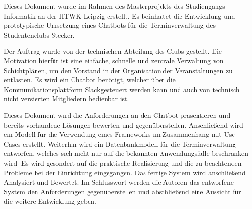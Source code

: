 Dieses Dokument wurde im Rahmen des Masterprojekts des Studiengangs Informatik an der HTWK-Leipzig erstellt. Es beinhaltet die Entwicklung und prototypische Umsetzung eines Chatbots für die Terminverwaltung des Studentenclubs \glqq Stecker\grqq .

Der Auftrag wurde von der technischen Abteilung des Clubs gestellt. Die Motivation hierfür ist eine einfache, schnelle und zentrale Verwaltung von Schichtplänen, um den Vorstand in der Organisation der Veranstaltungen zu entlasten.
Es wird ein Chatbot benötigt, welcher über die Kommunikationsplattform \glqq Slack\grqq gesteuert werden kann und auch von technisch nicht versierten Mitgliedern bedienbar ist.

Dieses Dokument wird die Anforderungen an den Chatbot präsentieren und bereits vorhandene Lösungen bewerten und gegenüberstellen. Anschließend wird ein Modell für die Verwendung eines Frameworks im Zusammenhang mit Use-Cases erstellt. Weiterhin wird ein Datenbankmodell für die Terminverwaltung entworfen, welches sich nicht nur auf die bekannten Anwendungsfälle beschränken wird. Es wird gesondert auf die praktische Realisierung und die zu beachtenden Probleme bei der Einrichtung eingegangen. Das fertige System wird anschließend Analysiert und Bewertet. Im Schlusswort werden die Autoren das entworfene System den Anforderungen gegenüberstellen und abschließend eine Aussicht für die weitere Entwicklung geben.